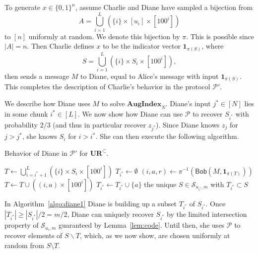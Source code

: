 \documentclass[11pt]{article}
\newcommand{\diane}{\mathsf{Diane}}
\newcommand{\query}{\mathsf{Bob}}
\newcommand{\aug}{\mathbf{AugIndex}\xspace}
\newcommand{\ur}{\mathbf{UR}\xspace}
\begin{document}
To generate $x\in\{0,1\}^n$, assume Charlie and Diane have sampled a bijection from 
\begin{equation}\label{eq:pi-origin}
A = \bigcup_{i=1}^L (\{i\} \times [u_i]\times [100^i])
\end{equation}
to $[n]$ uniformly at random. We denote this bijection by $\pi$. This is possible since $|A| = n$. Then Charlie defines $x$ to be the indicator vector $\mathbf{1}_{\pi(S)}$, where
$$
S = \bigcup_{i=1}^L (\{i\} \times S_i \times [100^i]),
$$
then sends a message $M$ to Diane, equal to Alice's message with input $\mathbf{1}_{\pi(S)}$. This completes the description of Charlie's behavior in the protocol $\mathcal P'$.

We describe how Diane uses $M$ to solve $\aug_N$. Diane's input $j^*\in[N]$ lies in some chunk $i^*\in[L]$. We now show how Diane can use $\mathcal P$ to recover $S_{i^*}$ with probability $2/3$ (and thus in particular recover $z_{j^*}$). Since Diane knows $z_j$ for $j>j^*$, she knows $S_i$ for $i>i^*$. She can then execute the following algorithm.


\begin{algorithm}[H] 
  \caption{Behavior of Diane in $\mathcal P'$ for $\ur^\subset$.} \label{algo:diane1}
  \begin{algorithmic}[1]
    \Procedure{$\diane$}{$M$}
    \State $T \leftarrow \bigcup_{i=i^*+1}^L (\{i\} \times S_i \times [100^i])$
    \State $T_{i^*}\leftarrow \emptyset$
      \State $(i,a,r)\leftarrow \pi^{-1}(\query(M, \mathbf{1}_{\pi(T)}))$
      \State $T\leftarrow T \cup ((i,a) \times [100^i])$
        \State $T_{i^*} \leftarrow T_{i^*}\cup \{a\}$
      \EndIf
    \EndWhile
    \State \Return the unique $S\in \mathcal S_{u_{i^*},m}$ with $T_{i^*}\subset S$ 
    \EndProcedure
  \end{algorithmic}
\end{algorithm}

In Algorithm~\ref{algo:diane1} Diane is building up a subset $T_{i^*}$ of $S_{i^*}$. Once $|T_{i^*}| \ge |S_{i^*}|/2 = m/2$, Diane can uniquely recover $S_{i^*}$ by the limited intersection property of $\mathcal{S}_{u_i,m}$ guaranteed by Lemma~\ref{lem:code}. Until then, she uses $\mathcal P$ to recover elements of $S\backslash T$, which, as we now show, are chosen uniformly at random from $S\setminus T$. 
\end{document}
